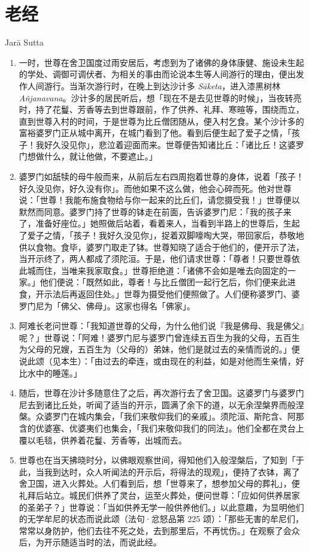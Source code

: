 \section{老经}

\begin{center}Jarā Sutta\end{center}\vspace{1em}

\begin{enumerate}\item 一时，世尊在舍卫国度过雨安居后，考虑到为了诸佛的身体康健、施设未生起的学处、调御可调伏者、为相关的事由而论说本生等人间游行的理由，便出发作人间游行。当渐次游行时，在晚上到达沙计多 \textit{Sāketa}，进入漆黑树林 \textit{Añjanavana}。沙计多的居民听后，想「现在不是去见世尊的时候」，当夜转亮时，持了花鬘、芳香等去到世尊跟前，作了供养、礼拜、寒暄等，围绕而立，直到世尊入村的时间，于是世尊为比丘僧团随从，便入村乞食。某个沙计多的富裕婆罗门正从城中离开，在城门看到了他。看到后便生起了爱子之情，「孩子！我好久没见你」，悲泣着迎面而来。世尊便告知诸比丘：「诸比丘！这婆罗门想做什么，就让他做，不要遮止。」
\item 婆罗门如舐犊的母牛般而来，从前后左右四周抱着世尊的身体，说着「孩子！好久没见你，好久没有你」。而他如果不这么做，他会心碎而死。他对世尊说：「世尊！我能布施食物给与你一起来的比丘们，请您摄受我！」世尊便以默然而同意。婆罗门持了世尊的钵走在前面，告诉婆罗门尼：「我的孩子来了，准备好座位。」她照做后站着，看着来人，当看到半路上的世尊后，生起了爱子之情，「孩子！我好久没见你」，捉着双脚嚎啕大哭，带回家后，恭敬地供以食物。食毕，婆罗门取走了钵。世尊知晓了适合于他们的，便开示了法，当开示终了，两人都成了须陀洹。于是，他们请求世尊：「尊者！只要世尊依此城而住，当唯来我家取食。」世尊拒绝道：「诸佛不会如是唯去向固定的一家。」他们便说：「既然如此，尊者！与比丘僧团一起行乞后，你们便来此进食，开示法后再返回住处。」世尊为摄受他们便照做了。人们便称婆罗门、婆罗门尼为「佛父、佛母」。这家也得名「佛家」。
\item 阿难长老问世尊：「我知道世尊的父母，为什么他们说『我是佛母、我是佛父』呢？」世尊说：「阿难！婆罗门尼与婆罗门曾连续五百生为我的父母，五百生为父母的兄嫂，五百生为（父母的）弟妹，他们是就过去的亲情而说的。」便说此颂（见本生）：「由过去的牵连，或由现在的利益，如是对他而生亲情，好比水中的睡莲。」
\item 随后，世尊在沙计多随意住了之后，再次游行去了舍卫国。这婆罗门与婆罗门尼去到诸比丘处，听闻了适当的开示，圆满了余下的道，以无余涅槃界而般涅槃。众婆罗门在城内集会，「我们来敬仰我们的亲戚」。须陀洹、斯陀含、阿那含的优婆塞、优婆夷们也集会，「我们来敬仰我们的同法」。他们全都在灵台上覆以毛毯，供养着花鬘、芳香等，出城而去。
\item 世尊也在当天拂晓时分，以佛眼观察世间，得知他们入般涅槃后，了知到「于此，当我到达时，众人听闻法的开示后，将得法的现观」，便持了衣钵，离了舍卫国，进入火葬处。人们看到后，想「世尊来了，想参加父母的葬礼」，便礼拜后站立。城民们供养了灵台，运至火葬处，便问世尊：「应如何供养居家的圣弟子？」世尊说：「当如供养无学一般供养他们。」以此意趣，为显明他们的无学牟尼的状态而说此颂（法句·忿怒品第 225 颂）：「那些无害的牟尼们，常常以身防护，他们去往不死之处，去到那里后，不再忧伤。」在观察了会众后，为开示随适当时的法，而说此经。\end{enumerate}

